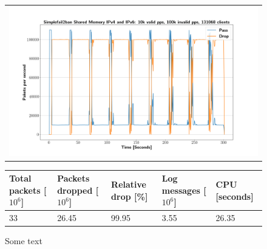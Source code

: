 \begin{figure}[p]
	\label{fig:simplefail2ban:shm:ip46:100k}
	\centering
	\scriptsize
	\begin{tabular}{c}
    	\centerline{\includegraphics[width=1.2\textwidth]{images/simplefail2ban_shm_ipv46_v10k_iv100k_c131068.png}}
	\end{tabular}
	\begin{tabular}{lllll}
		\toprule
		\textbf{Total packets [$10^6$]} & \textbf{Packets dropped [$10^6$]} & \textbf{Relative drop [\%]} & \textbf{Log messages [$10^6$]} & \textbf{CPU [seconds]} \\ \midrule 
		33 & 26.45 & 99.95 & 3.55 & 26.35 \\
		\bottomrule
	\end{tabular}
	\caption[Simplefail2ban Shared Memory IPv4 \& IPv6 100k PPS]{Some text}
\end{figure}

